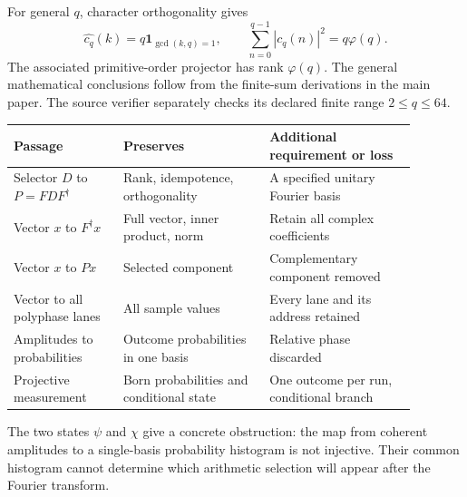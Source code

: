 For general $q$, character orthogonality gives
\[
 \widehat{c_q}(k)=q\mathbf1_{\gcd(k,q)=1},\qquad
 \sum_{n=0}^{q-1}|c_q(n)|^2=q\varphi(q).
\]
The associated primitive-order projector has rank $\varphi(q)$. The general mathematical conclusions follow from the finite-sum derivations in the main paper. The source verifier separately checks its declared finite range $2\leq q\leq64$.

\begin{center}
\begin{tabular}{L{0.24\linewidth}L{0.32\linewidth}L{0.32\linewidth}}\toprule
Passage & Preserves & Additional requirement or loss\\\midrule
Selector $D$ to $P=FDF^\dagger$ & Rank, idempotence, orthogonality & A specified unitary Fourier basis\\[5pt]
Vector $x$ to $F^\dagger x$ & Full vector, inner product, norm & Retain all complex coefficients\\[5pt]
Vector $x$ to $Px$ & Selected component & Complementary component removed\\[5pt]
Vector to all polyphase lanes & All sample values & Every lane and its address retained\\[5pt]
Amplitudes to probabilities & Outcome probabilities in one basis & Relative phase discarded\\[5pt]
Projective measurement & Born probabilities and conditional state & One outcome per run, conditional branch\\\bottomrule
\end{tabular}
\end{center}
The two states $\psi$ and $\chi$ give a concrete obstruction: the map from coherent amplitudes to a single-basis probability histogram is not injective. Their common histogram cannot determine which arithmetic selection will appear after the Fourier transform.

